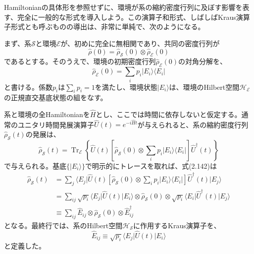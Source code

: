 \hypertarget{srcpage:110}{}\label{srcpage:110}
Hamiltonianの具体形を参照せずに、環境が系の縮約密度行列に及ぼす影響を表す、完全に一般的な形式を導入しよう。この演算子和形式、しばしばKraus演算子形式\cite{ref152}とも呼ぶものの導出は、非常に単純で、次のようになる。

まず、系$\mathcal S$と環境$\mathcal E$が、初めに完全に無相関であり、共同の密度行列が
\begin{equation}\hat\rho(0)=\hat\rho_{\mathcal S}(0)\otimes\hat\rho_{\mathcal E}(0)\tag{2.140}\end{equation}
であるとする。そのうえで、環境の初期密度行列$\hat\rho_{\mathcal E}(0)$の対角分解を、
\begin{equation}\hat\rho_{\mathcal E}(0)=\sum_i p_i\lvert E_i\rangle\langle E_i\rvert\tag{2.141}\end{equation}
と書ける。係数$p_i$は$\sum_i p_i=1$を満たし、環境状態$\lvert E_i\rangle$は、環境のHilbert空間$\mathcal H_{\mathcal E}$の正規直交基底状態の組をなす。

系と環境の全Hamiltonianを$\hat H$とし、ここでは時間に依存しないと仮定する。通常のユニタリ時間発展演算子$\hat U(t)=e^{-i\hat Ht}$が与えられると、系の縮約密度行列$\hat\rho_{\mathcal S}(t)$の発展は、
\begin{equation}\hat\rho_{\mathcal S}(t)=\operatorname{Tr}_{\mathcal E}\left\{\hat U(t)\left[\hat\rho_{\mathcal S}(0)\otimes\sum_i p_i\lvert E_i\rangle\langle E_i\rvert\right]\hat U^\dagger(t)\right\}\tag{2.142}\end{equation}
で与えられる。基底$\{\lvert E_i\rangle\}$で明示的にトレースを取れば、式(2.142)は
\begin{equation}\begin{split}
\hat\rho_{\mathcal S}(t)&=\sum_j\langle E_j\rvert\hat U(t)\left[\hat\rho_{\mathcal S}(0)\otimes\sum_i p_i\lvert E_i\rangle\langle E_i\rvert\right]\hat U^\dagger(t)\lvert E_j\rangle\\
&=\sum_{ij}\sqrt{p_i}\langle E_j\rvert\hat U(t)\lvert E_i\rangle\otimes\hat\rho_{\mathcal S}(0)\otimes\sqrt{p_i}\langle E_i\rvert\hat U^\dagger(t)\lvert E_j\rangle\\
&\equiv\sum_{ij}\hat E_{ij}\otimes\hat\rho_{\mathcal S}(0)\otimes\hat E_{ij}^\dagger
\end{split}\tag{2.143}\end{equation}
となる。最終行では、系のHilbert空間$\mathcal H_{\mathcal S}$に作用するKraus演算子\cite{ref152}を、
\begin{equation}\hat E_{ij}\equiv\sqrt{p_i}\langle E_j\rvert\hat U(t)\lvert E_i\rangle\tag{2.144}\end{equation}
と定義した。


